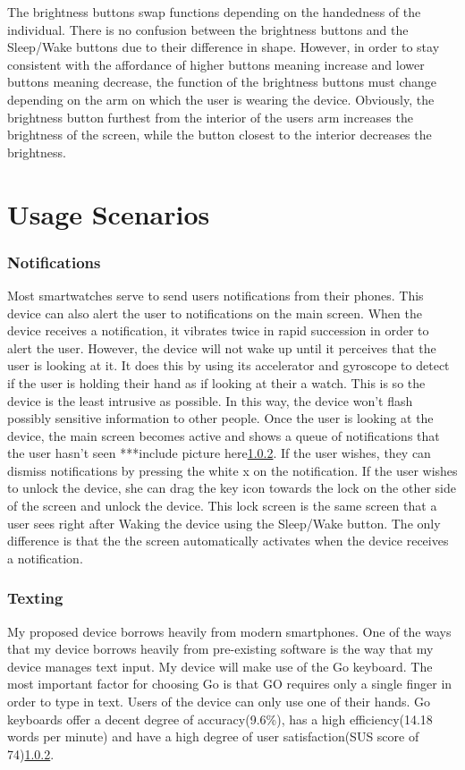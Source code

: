 \documentclass[11pt]{article}
\begin{document}
The brightness buttons swap functions depending on the handedness of the individual. There is no confusion between the brightness buttons and the Sleep/Wake buttons due to their difference in shape. However, in order to stay consistent with the affordance of higher buttons meaning increase and lower buttons meaning decrease, the function of the brightness buttons must change depending on the arm on which the user is wearing the device. Obviously, the brightness button furthest from the interior of the users arm increases the brightness of the screen, while the button closest to the interior decreases the brightness.

\section{Usage Scenarios}
\subsubsection{Notifications}
Most smartwatches serve to send users notifications from their phones. This device can also alert the user to notifications on the main screen. When the device receives a notification, it vibrates twice in rapid succession in order to alert the user. However, the device will not wake up until it perceives that the user is looking at it. It does this by using its accelerator and gyroscope to detect if the user is holding their hand as if looking at their a watch. This is so the device is the least intrusive as possible. In this way, the device won't flash possibly sensitive information to other people. Once the user is looking at the device, the main screen becomes active and shows a queue of notifications that the user hasn't seen ***include picture here\ref{}. If the user wishes, they can dismiss notifications by pressing the white x on the notification. If the user wishes to unlock the device, she can drag the key icon towards the lock on the other side of the screen and unlock the device. This lock screen is the same screen that a user sees right after Waking the device using the Sleep/Wake button. The only difference is that the the screen automatically activates when the device receives a notification. 

\subsubsection{Texting}
My proposed device borrows heavily from modern smartphones. One of the ways that my device borrows heavily from pre-existing software is the way that my device manages text input. My device will make use of the Go keyboard. The most important factor for choosing Go is that GO requires only a single finger in order to type in text. Users of the device can only use one of their hands. Go keyboards offer a decent degree of accuracy(9.6\%), has a high efficiency(14.18 words per minute) and have a high degree of user satisfaction(SUS score of 74)\ref{}.
\end{document}
